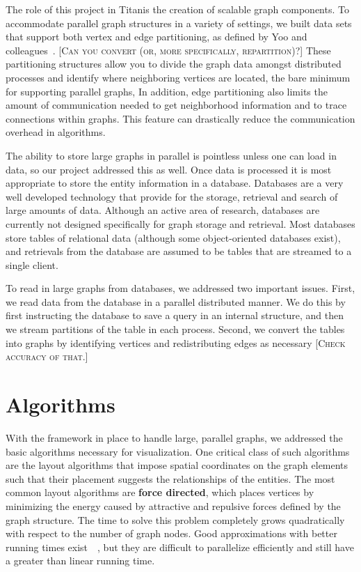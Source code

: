\documentclass[pdf,12pt,report,strict]{SANDreport}
\newcommand*{\lcite}[1]{~\cite{#1}}
\newcommand*{\scite}[1]{~\cite{#1}}
\newcommand{\titan}{Titan}
\newcommand*{\keyterm}[1]{\textbf{#1}}
\newcommand{\sticky}[1]{\textsc{[#1]}}
\begin{document}

The role of this project in \titan is the creation of scalable graph
components.  To accommodate parallel graph structures in a variety of
settings, we built data sets that support both vertex and edge
partitioning, as defined by Yoo and colleagues\scite{Yoo05}. \sticky{Can
  you convert (or, more specifically, repartition)?}  These partitioning
structures allow you to divide the graph data amongst distributed processes
and identify where neighboring vertices are located, the bare minimum for
supporting parallel graphs, In addition, edge partitioning also limits the
amount of communication needed to get neighborhood information and to trace
connections within graphs.  This feature can drastically reduce the
communication overhead in algorithms.

The ability to store large graphs in parallel is pointless unless one can
load in data, so our project addressed this as well.  Once data is
processed it is most appropriate to store the entity information in a
database.  Databases are a very well developed technology that provide for
the storage, retrieval and search of large amounts of data.  Although an
active area of research, databases are currently not designed specifically
for graph storage and retrieval.  Most databases store tables of relational
data (although some object-oriented databases exist), and retrievals from
the database are assumed to be tables that are streamed to a single client.

To read in large graphs from databases, we addressed two important issues.
First, we read data from the database in a parallel distributed manner.  We
do this by first instructing the database to save a query in an internal
structure, and then we stream partitions of the table in each process.
Second, we convert the tables into graphs by identifying vertices and
redistributing edges as necessary \sticky{Check accuracy of that.}

\section{Algorithms}


With the framework in place to handle large, parallel graphs, we addressed
the basic algorithms necessary for visualization.  One critical class of
such algorithms are the layout algorithms that impose spatial coordinates
on the graph elements such that their placement suggests the relationships
of the entities.  The most common layout algorithms are
\keyterm{force directed}, which places
vertices by minimizing the energy caused by attractive and repulsive
forces defined by the graph structure.  The time to solve this problem
completely grows quadratically with respect to the number of graph nodes.
Good approximations with better running times exist~\lcite{Hachul04}, but
they are difficult to parallelize efficiently and still have a greater than
linear running time.
\end{document}
